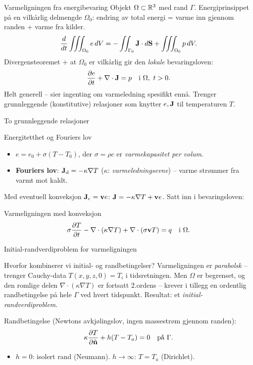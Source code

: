 \documentclass[11pt,aspectratio=169]{beamer}
\begin{document}
\begin{frame}{Varmeligningen fra energibevaring}
Objekt $\Omega\subset\mathbb{R}^3$ med rand $\Gamma$. Energiprinsippet på en vilkårlig delmengde $\Omega_0$: endring av total energi = varme inn gjennom randen + varme fra kilder.
\[
\frac{d}{dt}\iiint_{\Omega_0} e\,dV = -\iint_{\Gamma_0}\mathbf{J}\cdot d\mathbf{S} + \iiint_{\Omega_0} p\,dV.
\]
Divergensteoremet $+$ at $\Omega_0$ er vilkårlig gir den \emph{lokale} bevaringsloven:
\begin{equation}
\frac{\partial e}{\partial t} + \nabla\cdot\mathbf{J} = p \quad \text{i } \Omega,\ t>0.
\end{equation}
Helt generell -- sier ingenting om varmeledning spesifikt ennå. Trenger grunnleggende (konstitutive) relasjoner som knytter $e,\mathbf{J}$ til temperaturen $T$.
\end{frame}

\begin{frame}{To grunnleggende relasjoner}
\begin{defnb}{Energitetthet og Fouriers lov}
\begin{itemize}
\item $e = e_0+\sigma(T-T_0)$, der $\sigma=\rho c$ er \emph{varmekapasitet per volum}.
\item \textbf{Fouriers lov}: $\mathbf{J}_{\text d}=-\kappa\nabla T$ ($\kappa$: \emph{varmeledningsevne}) -- varme strømmer fra varmt mot kaldt.
\end{itemize}
\end{defnb}
Med eventuell konveksjon $\mathbf{J}_{\text c}=\mathbf{v} e$: $\mathbf{J}=-\kappa\nabla T+\mathbf{v} e$. Satt inn i bevaringsloven:
\begin{oppsumb}{Varmeligningen med konveksjon}
\[
\sigma\frac{\partial T}{\partial t} - \nabla\cdot(\kappa\nabla T) + \nabla\cdot(\sigma\mathbf{v} T) = q \quad \text{i }\Omega.
\]
\end{oppsumb}
\end{frame}

\begin{frame}{Initial-randverdiproblem for varmeligningen}
\begin{remb}{Hvorfor kombinerer vi initial- og randbetingelser?}
Varmeligningen er \emph{parabolsk} -- trenger Cauchy-data $T(x,y,z,0)=T_i$ i tidsretningen. Men $\Omega$ er begrenset, og den romlige delen $\nabla\cdot(\kappa\nabla T)$ er fortsatt 2.ordens -- krever i tillegg en ordentlig randbetingelse på hele $\Gamma$ ved hvert tidspunkt. Resultat: et \emph{initial-randverdiproblem}.
\end{remb}
Randbetingelse (Newtons avkjølingslov, ingen massestrøm gjennom randen):
\begin{equation}
\kappa\frac{\partial T}{\partial\hat{\mathbf{n}}} + h(T-T_a) = 0 \quad \text{på }\Gamma.
\end{equation}
\begin{itemize}
\item $h=0$: isolert rand (Neumann). \quad\quad $h\to\infty$: $T=T_a$ (Dirichlet).
\end{itemize}
\end{frame}
\end{document}
